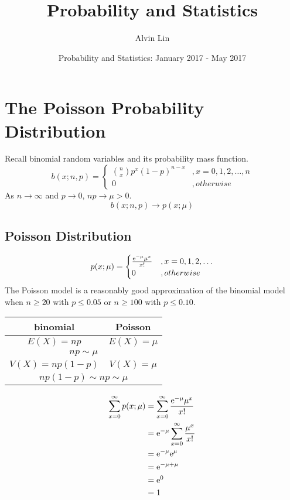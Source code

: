 \documentclass[letterpaper, 12pt]{math}
\title{Probability and Statistics}
\author{Alvin Lin}
\date{Probability and Statistics: January 2017 - May 2017}
\begin{document}
\maketitle

\section*{The Poisson Probability Distribution}
Recall binomial random variables and its probability mass function.
\[ b(x;n,p) =
  \begin{cases}
    \binom{n}{x}p^{x}(1-p)^{n-x} &, x = 0,1,2,\dots,n \\
    0 &, otherwise
  \end{cases}
\]
As \( n\to\infty \) and \( p\to 0 \), \( np\to\mu > 0 \).
\[ b(x;n,p)\to p(x;\mu) \]

\subsection*{Poisson Distribution}
\[ p(x;\mu) =
  \begin{cases}
    \frac{\mathrm{e}^{-\mu}\mu^{x}}{x!} &, x = 0,1,2,\dots \\
    0 &, otherwise
  \end{cases}
\]
The Poisson model is a reasonably good approximation of the binomial model
when \( n \geq 20 \) with \( p \leq 0.05 \) or \( n \geq 100 \) with
\( p \leq 0.10 \).
\begin{center}
  \begin{tabular}{|c|c|}
    \hline
    binomial & Poisson \\
    \hline
    \( E(X) = np \) & \( E(X) = \mu \) \\
    \hline
    \multicolumn{2}{|c|}{\( np \sim \mu \)} \\
    \hline
    \( V(X) = np(1-p) \) & \( V(X) = \mu \) \\
    \hline
    \multicolumn{2}{|c|}{\( np(1-p) \sim np \sim \mu \)} \\
    \hline
  \end{tabular}
\end{center}
\begin{align*}
  \sum_{x=0}^{\infty}p(x;\mu) &=
    \sum_{x=0}^{\infty}\frac{\mathrm{e}^{-\mu}\mu^{x}}{x!} \\
  &= \mathrm{e}^{-\mu}\sum_{x=0}^{\infty}\frac{\mu^{x}}{x!} \\
  &= \mathrm{e}^{-\mu}\mathrm{e}^{\mu} \\
  &= \mathrm{e}^{-\mu+\mu} \\
  &= \mathrm{e}^{0} \\
  &= 1
\end{align*}
\end{document}
